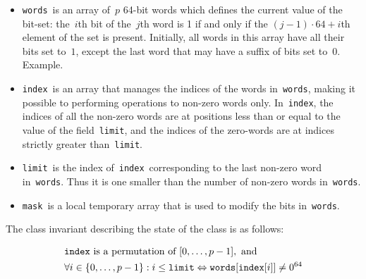 \documentclass[a4paper,11pt]{article}
\newcommand{\Todo}[1]{{\color{blue}#1}}
\newcommand{\Words}{\texttt{words}}
\newcommand{\Index}{\texttt{index}}
\newcommand{\Mask}{\texttt{mask}}
\newcommand{\Limit}{\texttt{limit}}
\newcommand{\SparseBitSet}{\texttt{SparseBitSet}}
\numberwithin{equation}{section}
\begin{document}
\begin{itemize}
  \item \Words~is an array of~$p$ 64-bit words which defines the current value of the bit-set:
    the~$i$th bit of the~$j$th word is 1 if and only if the $(j-1) \cdot 64 + i$th element of
    the set is present. Initially, all words in this array have all their bits set to~$1$,
    except the last word that may have a suffix of bits set to~$0$. \Todo{Example.}

  \item \Index~is an array that manages the indices of the words in~\Words,
    making it possible to performing operations to non-zero words only.
    In~\Index, the
    indices of all the non-zero words are at positions less than or
    equal to the value of the field~\Limit, and the indices of the zero-words are
    at indices strictly greater than~\Limit. 

  \item \Limit~is the index of~\Index~corresponding to the last non-zero word in~\Words.
    Thus it is one smaller than the number of non-zero words in~\Words.

  \item \Mask~is a local temporary array that is used to modify the bits in~\Words.
    
\end{itemize}

\noindent
The class invariant describing the state of the class is as follows:

\begin{alignat}{1}
  \label{eq:invariant}
  &\Index~\text{is a permutation of~} [0,\dots,p-1],\text{~and} \\
  &\forall i \in \Set{0,\dots,p-1}: i \leq \Limit \Leftrightarrow \Words[\Index[i]] \neq 0^{64}
\end{alignat}

\end{document}

